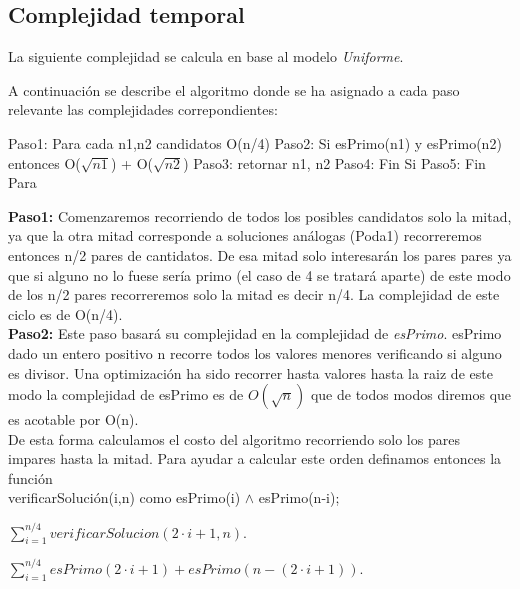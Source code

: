 \documentclass[11pt, a4paper, spanish]{article}
\begin{document}
\newpage		

\subsection{Complejidad temporal}
	
	La siguiente complejidad se calcula en base al modelo \emph{Uniforme}. 
	
	A continuaci\'on se describe el algoritmo donde se ha asignado a cada paso relevante las complejidades correpondientes:

	Paso1:    Para cada n1,n2 candidatos O(n/4)
	Paso2:       Si esPrimo(n1) y esPrimo(n2) entonces 	O($\sqrt{n1}$) + O($\sqrt{n2}$)
	Paso3:         retornar n1, n2
	Paso4:       Fin Si
	Paso5:    Fin Para 

		
	\textbf{Paso1:} Comenzaremos recorriendo de todos los posibles candidatos solo la mitad, ya que la otra mitad corresponde a soluciones an\'alogas (Poda1) recorreremos entonces n/2 pares de cantidatos. De esa mitad solo interesar\'an los pares pares ya que si alguno no lo fuese ser\'ia primo (el caso de 4 se tratar\'a aparte) de este modo de los n/2 pares recorreremos solo la mitad es decir n/4. La complejidad de este ciclo es de O(n/4).\\
	
	\textbf{Paso2:} Este paso basar\'a su complejidad en la complejidad de \emph{esPrimo}.
esPrimo dado un entero positivo n recorre todos los valores menores verificando si alguno
es divisor. Una optimizaci\'on ha sido recorrer hasta valores hasta la raiz de este modo la complejidad de esPrimo es de $O(\sqrt{n})$ que de todos modos diremos que es acotable por O(n).\\

De esta forma calculamos el costo del algoritmo recorriendo solo los pares impares hasta la mitad. Para ayudar a calcular este orden definamos entonces la funci\'on\\ verificarSoluci\'on(i,n) como esPrimo(i) $\wedge$ esPrimo(n-i);\\

	\begin{center}
	$\displaystyle\sum\limits_{i=1}^{n/4}  verificarSolucion(2 \cdot i+1,n)$.\\
	\end{center}
	
	\begin{center}
	$\displaystyle\sum\limits_{i=1}^{n/4} esPrimo(2 \cdot i+1)+esPrimo(n-(2 \cdot i+1))$.\\
	\end{center}
	
\end{document}
